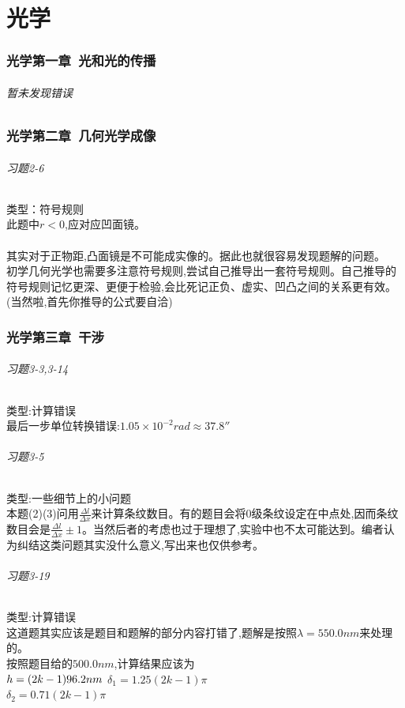 \documentclass[a4paper,11pt]{ctexart}
\begin{document}
\part{光学}
\section{光学第一章\ 光和光的传播}
\paragraph{暂未发现错误}

\section{光学第二章\ 几何光学成像}
\paragraph{习题2-6}类型：符号规则\\
此题中$r < 0$,应对应凹面镜。\\\\
其实对于正物距,凸面镜是不可能成实像的。据此也就很容易发现题解的问题。\\初学几何光学也需要多注意符号规则,尝试自己推导出一套符号规则。自己推导的符号规则记忆更深、更便于检验,会比死记正负、虚实、凹凸之间的关系更有效。(当然啦,首先你推导的公式要自洽)

\section{光学第三章\ 干涉}
\paragraph{习题3-3,3-14}类型:计算错误\\
最后一步单位转换错误:$1.05 \times 10^{-2}rad \approx 37.8''$

\paragraph{习题3-5}类型:一些细节上的小问题\\
本题(2)(3)问用$\frac{\Delta l}{\Delta x} $来计算条纹数目。有的题目会将0级条纹设定在中点处,因而条纹数目会是$\frac{\Delta l}{\Delta x} \pm 1$。当然后者的考虑也过于理想了,实验中也不太可能达到。编者认为纠结这类问题其实没什么意义,写出来也仅供参考。

\paragraph{习题3-19}类型:计算错误\\
这道题其实应该是题目和题解的部分内容打错了,题解是按照$\lambda=550.0nm$来处理的。\\
按照题目给的$500.0nm$,计算结果应该为\\
$h =(2k-1)96.2nm \\$
$\delta_1 = 1.25(2k-1) \pi $\\
$\delta_2 = 0.71(2k-1) \pi $\\
\end{document}

